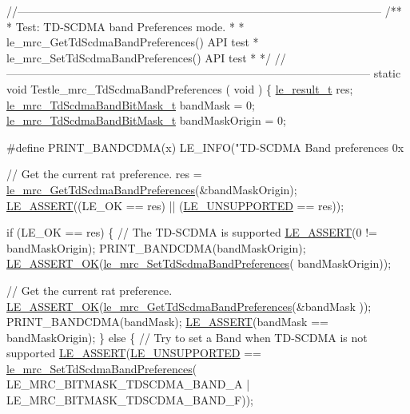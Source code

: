 \begin{DoxyCodeInclude}
{{\textcolor{comment}{//--------------------------------------------------------------------------------------------------}\textcolor{comment}{}
\textcolor{comment}{/**}
\textcolor{comment}{ * Test: TD-SCDMA band Preferences mode.}
\textcolor{comment}{ *}
\textcolor{comment}{ * le\_mrc\_GetTdScdmaBandPreferences() API test}
\textcolor{comment}{ * le\_mrc\_SetTdScdmaBandPreferences() API test}
\textcolor{comment}{ *}
\textcolor{comment}{ */}
\textcolor{comment}{//--------------------------------------------------------------------------------------------------}
\textcolor{keyword}{static} \textcolor{keywordtype}{void} Testle\_mrc\_TdScdmaBandPreferences
(
    \textcolor{keywordtype}{void}
)
\{
    \hyperlink{le__basics_8h_a1cca095ed6ebab24b57a636382a6c86c}{le\_result\_t} res;
    \hyperlink{le__mrc__interface_8h_a418a508a9a6dbd3a4a68458f0c64a00e}{le\_mrc\_TdScdmaBandBitMask\_t} bandMask = 0;
    \hyperlink{le__mrc__interface_8h_a418a508a9a6dbd3a4a68458f0c64a00e}{le\_mrc\_TdScdmaBandBitMask\_t} bandMaskOrigin = 0;

\textcolor{preprocessor}{#define  PRINT\_BANDCDMA(x)   LE\_INFO("TD-SCDMA Band preferences 0x%

    \textcolor{comment}{// Get the current rat preference.}
    res = \hyperlink{le__mrc__interface_8h_aed41544004ed7df9de8e874b8bb09d3b}{le\_mrc\_GetTdScdmaBandPreferences}(&bandMaskOrigin);
    \hyperlink{le__log_8h_ac0dbbef91dc0fed449d0092ff0557b39}{LE\_ASSERT}((LE\_OK == res) || (\hyperlink{le__basics_8h_a1cca095ed6ebab24b57a636382a6c86ca5377262702e8434207b03533259e0c5f}{LE\_UNSUPPORTED} == res));

    \textcolor{keywordflow}{if} (LE\_OK == res)
    \{
        \textcolor{comment}{// The TD-SCDMA is supported}
        \hyperlink{le__log_8h_ac0dbbef91dc0fed449d0092ff0557b39}{LE\_ASSERT}(0 != bandMaskOrigin);
        PRINT\_BANDCDMA(bandMaskOrigin);
        \hyperlink{le__log_8h_a7cd2daa3d4af1de4d29e0eed95187484}{LE\_ASSERT\_OK}(\hyperlink{le__mrc__interface_8h_a8765511597189b64e486fa8f17bcddcd}{le\_mrc\_SetTdScdmaBandPreferences}(
      bandMaskOrigin));

        \textcolor{comment}{// Get the current rat preference.}
        \hyperlink{le__log_8h_a7cd2daa3d4af1de4d29e0eed95187484}{LE\_ASSERT\_OK}(\hyperlink{le__mrc__interface_8h_aed41544004ed7df9de8e874b8bb09d3b}{le\_mrc\_GetTdScdmaBandPreferences}(&bandMask
      ));
        PRINT\_BANDCDMA(bandMask);
        \hyperlink{le__log_8h_ac0dbbef91dc0fed449d0092ff0557b39}{LE\_ASSERT}(bandMask == bandMaskOrigin);
    \}
    \textcolor{keywordflow}{else}
    \{
        \textcolor{comment}{// Try to set a Band when TD-SCDMA is not supported}
        \hyperlink{le__log_8h_ac0dbbef91dc0fed449d0092ff0557b39}{LE\_ASSERT}(\hyperlink{le__basics_8h_a1cca095ed6ebab24b57a636382a6c86ca5377262702e8434207b03533259e0c5f}{LE\_UNSUPPORTED} == 
      \hyperlink{le__mrc__interface_8h_a8765511597189b64e486fa8f17bcddcd}{le\_mrc\_SetTdScdmaBandPreferences}(
                                                       LE\_MRC\_BITMASK\_TDSCDMA\_BAND\_A |
                                                       LE\_MRC\_BITMASK\_TDSCDMA\_BAND\_F));

}}}
\end{DoxyCodeInclude}
